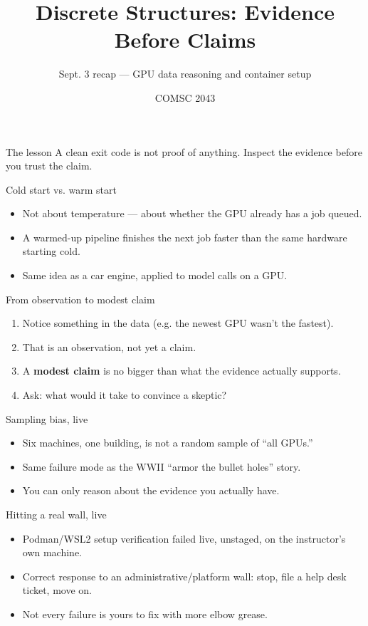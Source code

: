 \documentclass[aspectratio=169,10pt]{beamer}
\title{Discrete Structures: Evidence Before Claims}
\subtitle{Sept. 3 recap — GPU data reasoning and container setup}
\author{COMSC 2043}
\date{}
\begin{document}
\frame{\titlepage}
\begin{frame}{The lesson}{\Large\centering
A clean exit code is not proof of anything. Inspect the evidence before you trust the claim.}
\end{frame}
\begin{frame}{Cold start vs. warm start}
\begin{itemize}
\item Not about temperature — about whether the GPU already has a job queued.
\item A warmed-up pipeline finishes the next job faster than the same hardware starting cold.
\item Same idea as a car engine, applied to model calls on a GPU.
\end{itemize}
\end{frame}
\begin{frame}{From observation to modest claim}
\begin{enumerate}
\item Notice something in the data (e.g. the newest GPU wasn't the fastest).
\item That is an observation, not yet a claim.
\item A \textbf{modest claim} is no bigger than what the evidence actually supports.
\item Ask: what would it take to convince a skeptic?
\end{enumerate}
\end{frame}
\begin{frame}{Sampling bias, live}
\begin{itemize}
\item Six machines, one building, is not a random sample of ``all GPUs.''
\item Same failure mode as the WWII ``armor the bullet holes'' story.
\item You can only reason about the evidence you actually have.
\end{itemize}
\end{frame}
\begin{frame}{Hitting a real wall, live}
\begin{itemize}
\item Podman/WSL2 setup verification failed live, unstaged, on the instructor's own machine.
\item Correct response to an administrative/platform wall: stop, file a help desk ticket, move on.
\item Not every failure is yours to fix with more elbow grease.
\end{itemize}
\end{frame}
\end{document}

